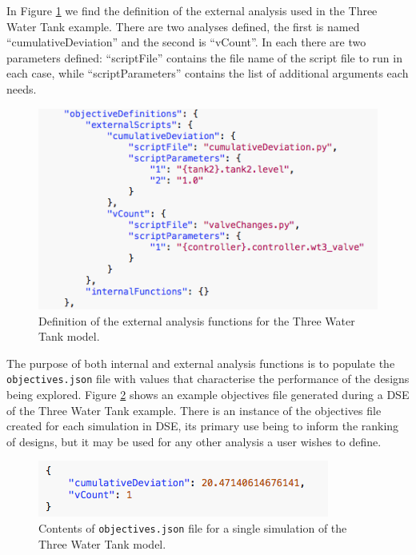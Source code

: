 In Figure \ref{fig:dse:edit:objectivesexternal-ttwt} we find the definition of the external analysis used in the Three Water Tank example.  There are two analyses defined, the first is named ``cumulativeDeviation'' and the second is ``vCount''.  In each there are two parameters defined:  ``scriptFile'' contains the file name of the script file to run in each case, while ``scriptParameters'' contains the list of additional arguments each needs.  
%
%
%
\begin{figure}[ht]
	\centering
	\includegraphics[scale=0.55]{figures/dse/config-objectivesexternal-ttwt}
	\caption{Definition of the external analysis functions for the Three Water Tank model.}\label{fig:dse:edit:objectivesexternal-ttwt}
\end{figure}
%
%
%

The purpose of both internal and external analysis functions is to populate the \texttt{objectives.json} file with values that characterise the performance of the designs being explored.  Figure \ref{fig:dse:edit:objectivejson} shows an example objectives file generated during a DSE of the Three Water Tank example.  There is an instance of the objectives file created for each simulation in DSE, its primary use being to inform the ranking of designs, but it may be used for any other analysis a user wishes to define.
%
%
%
\begin{figure}[ht]
	\centering
	\includegraphics[scale=0.55]{figures/dse/objectivejson}
	\caption{Contents of \texttt{objectives.json} file for a single simulation of the Three Water Tank model.}\label{fig:dse:edit:objectivejson}
\end{figure}
%
%
%
